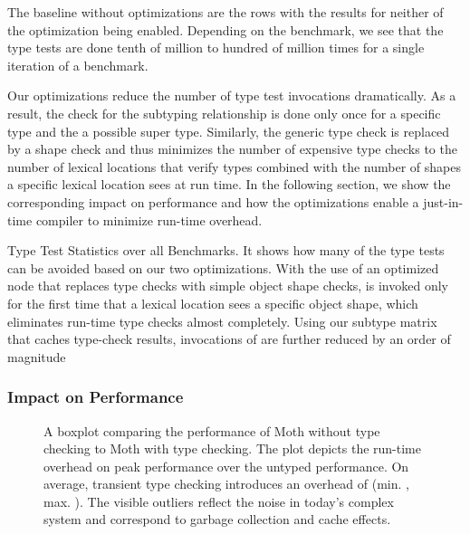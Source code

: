 The baseline without optimizations are the rows with the results
for neither of the optimization being enabled.
Depending on the benchmark, we see that the type tests are done tenth of million
to hundred of million times for a single iteration of a benchmark.

Our optimizations reduce the number of type test invocations dramatically.
As a result, the check for the subtyping relationship is done only once for 
a specific type and the a possible super type.
Similarly, the generic type check is replaced by a shape check
and thus minimizes the number of expensive type checks
to the number of lexical locations that verify types
combined with the number of shapes a specific lexical location sees at run time.
In the following section, we show the corresponding impact on performance
and how the optimizations enable a just-in-time compiler to minimize run-time overhead.

\begin{table}
  \caption{Type Test Statistics over all Benchmarks.
  It shows how many of the type tests can be avoided based on our two optimizations.
  With the use of an optimized node that replaces type checks with simple object shape checks,
   is invoked only for the first time that a lexical location
  sees a specific object shape, which eliminates run-time type checks almost completely.
  Using our subtype matrix that caches type-check results,
  invocations of  are further reduced by an order of magnitude}
  \label{tab:type-statistics}

  \begin{center}
    \TypingStatsTable{}  
  \end{center}
\end{table}

\subsubsection{Impact on Performance}

\begin{figure}
	\TypingOverhead{}
	\caption{A boxplot comparing the performance of Moth without type checking
  to Moth with type checking.
  The plot depicts the run-time overhead on peak performance over
  the untyped performance. On average, transient type checking introduces
  an overhead of \OverheadTypingGMeanP (min. \OverheadTypingMinP, max. \OverheadTypingMaxP).
  The visible outliers reflect the noise in today's complex system
  and correspond \eg to garbage collection and cache effects.}
	\label{fig:typing-overhead}
\end{figure}

